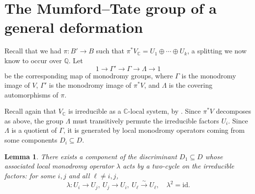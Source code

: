 \documentclass[12pt]{amsart}
\newcommand{\Q}{\mathbb{Q}}
\newcommand{\C}{\mathbb{C}}
\newcommand{\id}{\mathrm{id}}
\newtheorem{lemma}[theorem]{Lemma}
\theoremstyle{definition}
\numberwithin{equation}{section}
\begin{document}
\section{The Mumford--Tate group of a general deformation}


Recall that we had \(\pi: B' \to B\) such that \(\pi^* V_\C = U_1 \oplus \cdots \oplus U_k\),
a splitting we now know to occur over \(\Q\). Let 
\begin{equation*}
    1 \to \Gamma' \to \Gamma \to \Lambda \to 1
\end{equation*}
be the corresponding map of monodromy groups, where \(\Gamma\) is the monodromy image 
of \(V\), \(\Gamma'\) is the monodromy image of \(\pi^* V\), and \(\Lambda\) is the 
covering automorphisms of \(\pi\). 

Recall again that \(V_\C\) is irreducible as a \(\C\)-local system, by \cite{varvak25}. 
Since \(\pi^* V\) decomposes as above, the group \(\Lambda\) must transitively 
permute the irreducible factors \(U_i\). Since \(\Lambda\) is a quotient of \(\Gamma\), 
it is generated by local monodromy operators coming from some components 
\(D_i \subseteq D\).

\begin{lemma} \label{two-cycle-monodromy}
    There exists a component of the discriminant 
    \(D_1 \subseteq D\) whose associated local monodromy operator \(\lambda\) 
    acts by a two-cycle on the irreducible factors: for some \(i, j\) and all 
    \(\ell \neq i, j\),
    \[\lambda: U_i \to U_j,\ U_j \to U_i,\ U_\ell \xrightarrow{\sim} U_\ell, \quad 
    \lambda^2 = \id.\]
\end{lemma}
\end{document}
